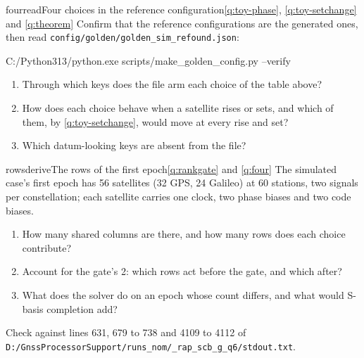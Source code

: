 \begin{question}{four}{read}{Four choices in the reference configuration}{\ref{q:toy-phase}, \ref{q:toy-setchange} and \ref{q:theorem}}
Confirm that the reference configurations are the generated ones, then read
\texttt{config/golden/golden\_sim\_refound.json}:
\begin{cmd}
C:/Python313/python.exe scripts/make_golden_config.py --verify
\end{cmd}
\begin{enumerate}[leftmargin=*, itemsep=1pt]
\item Through which keys does the file arm each choice of the table above?
\item How does each choice behave when a satellite rises or sets, and which of
      them, by \cref{q:toy-setchange}, would move at every rise and set?
\item Which datum-looking keys are absent from the file?
\end{enumerate}
\end{question}

\begin{question}{rows}{derive}{The rows of the first epoch}{\ref{q:rankgate} and \ref{q:four}}
The simulated case's first epoch has 56 satellites (32 GPS, 24 Galileo) at 60
stations, two signals per constellation; each satellite carries one clock, two
phase biases and two code biases.
\begin{enumerate}[leftmargin=*, itemsep=1pt]
\item How many shared columns are there, and how many rows does each choice
      contribute?
\item Account for the gate's 2: which rows act before the gate, and which after?
\item What does the solver do on an epoch whose count differs, and what would
      S-basis completion add?
\end{enumerate}
Check against lines 631, 679 to 738 and 4109 to 4112 of
\texttt{D:/GnssProcessorSupport/runs\_nom/\_rap\_scb\_g\_q6/stdout.txt}.
\end{question}

